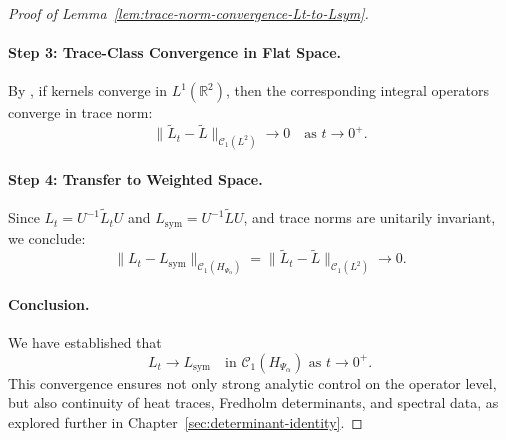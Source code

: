 \begin{proof}[Proof of Lemma~\ref{lem:trace-norm-convergence-Lt-to-Lsym}]
\paragraph{Step 3: Trace-Class Convergence in Flat Space.}
By \cite[Theorem~3.1]{Simon2005TraceIdeals}, if kernels converge in \( L^1(\mathbb{R}^2) \), then the corresponding integral operators converge in trace norm:
\[
\| \widetilde{L}_t - \widetilde{L} \|_{\mathcal{C}_1(L^2)} \to 0 \quad \text{as } t \to 0^+.
\]

\paragraph{Step 4: Transfer to Weighted Space.}
Since \( L_t = U^{-1} \widetilde{L}_t U \) and \( L_{\mathrm{sym}} = U^{-1} \widetilde{L} U \), and trace norms are unitarily invariant, we conclude:
\[
\| L_t - L_{\mathrm{sym}} \|_{\mathcal{C}_1(H_{\Psi_\alpha})} = \| \widetilde{L}_t - \widetilde{L} \|_{\mathcal{C}_1(L^2)} \to 0.
\]

\paragraph{Conclusion.}
We have established that
\[
L_t \to L_{\mathrm{sym}} \quad \text{in } \mathcal{C}_1(H_{\Psi_\alpha}) \text{ as } t \to 0^+.
\]
This convergence ensures not only strong analytic control on the operator level, but also continuity of heat traces, Fredholm determinants, and spectral data, as explored further in Chapter~\ref{sec:determinant-identity}.
\end{proof}
